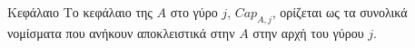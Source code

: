 {}
\begin{definitiongr}{Κεφάλαιο}
  Το κεφάλαιο της $A$ στο γύρο $j$, $Cap_{A, j}$, ορίζεται ως τα συνολικά νομίσματα που ανήκουν αποκλειστικά στην $A$ στην
  αρχή του γύρου $j$.
\end{definitiongr}
